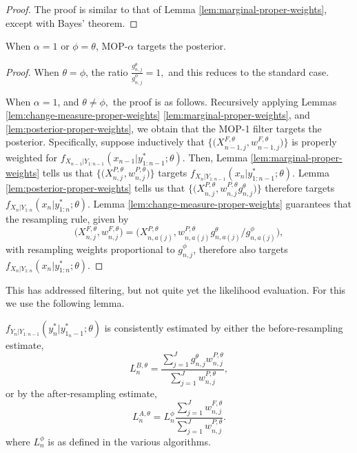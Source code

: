 \documentclass{article}
\begin{document}
\begin{proof}
    The proof is similar to that of Lemma \ref{lem:marginal-proper-weights}, except with Bayes' theorem. 
\end{proof}


\begin{prop}
    When $\alpha=1$ or $\phi=\theta$, MOP-$\alpha$ targets the posterior. 
\end{prop}
\begin{proof}
    When $\theta=\phi$, the ratio $\frac{g_{n,j}^\theta}{g_{n,j}^\phi}=1,$ and this reduces to the standard case.

    When $\alpha=1$, and $\theta\neq\phi,$ the proof is as follows. Recursively applying Lemmas \ref{lem:change-measure-proper-weights} \ref{lem:marginal-proper-weights}, and \ref{lem:posterior-proper-weights}, we obtain that 
    the MOP-1 filter targets the posterior.
    Specifically, suppose inductively that $\big\{\big(X^{F,\theta}_{n-1,j},w^{F,\theta}_{n-1,j}\big)\big\}$ is properly weighted for $f_{X_{n-1}|Y_{1:n-1}}(x_{n-1}|y^*_{1:n-1};\theta)$.
    Then, Lemma \ref{lem:marginal-proper-weights} tells us that $\big\{\big(X^{P,\theta}_{n,j},w^{P,\theta}_{n,j}\big)\big\}$ targets $f_{X_{n}|Y_{1:n-1}}(x_{n}|y^*_{1:n-1};\theta)$.
    Lemma \ref{lem:posterior-proper-weights} tells us that $\big\{\big(X^{P,\theta}_{n,j},w^{P,\theta}_{n,j} g^\theta_{n,j} \big)\big\}$ therefore targets  $f_{X_{n}|Y_{1:n}}(x_{n}|y^*_{1:n};\theta)$.
    Lemma \ref{lem:change-measure-proper-weights} guarantees that the resampling rule, given by 
    \[
    \big(X^{F,\theta}_{n,j},w^{F,\theta}_{n,j}\big) = \big(X^{P,\theta}_{n,a(j)}, w^{P,\theta}_{n,a(j)} g^\theta_{n,a(j)}\big/ g^\phi_{n,a(j)}\big),
    \]
    with resampling weights proportional to $g^\phi_{n,j}$, therefore also targets $f_{X_{n}|Y_{1:n}}(x_{n}|y^*_{1:n};\theta)$.
\end{proof}


This has addressed filtering, but not quite yet the likelihood evaluation. For this we use the following lemma.

\begin{lem}
    \label{lem:lik-proper-weight}
  $f_{Y_n|Y_{1:n-1}}(y_n^*|y_{1_n-1}^*;\theta)$ is consistently estimated by either the before-resampling estimate,
\begin{equation}\label{L1}
L_n^{B,\theta} =  \frac{\sum_{j=1}^Jg^\theta_{n,j} w^{P,\theta}_{n,j}}{\sum_{j=1}^J  w^{P,\theta}_{n,j}},
\end{equation}
or by the after-resampling estimate,
\begin{equation}\label{L2}
L_n^{A,\theta} = L^\phi_n \frac{\sum_{j=1}^Jw^{F,\theta}_{n,j}}{\sum_{j=1}^J  w^{P,\theta}_{n,j}}.
\end{equation}
where $L^\phi_n$ is as defined in the various algorithms.
\end{lem}
\end{document}
